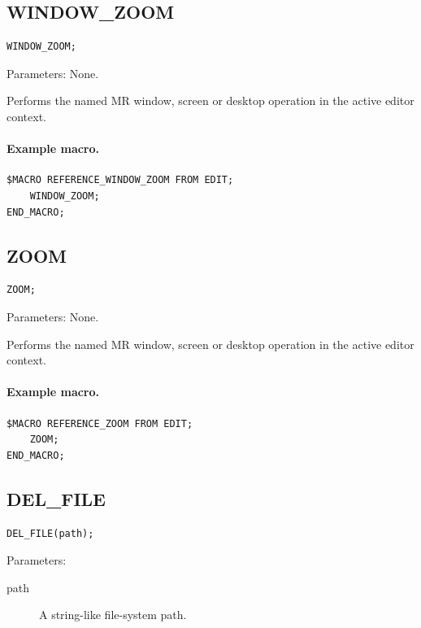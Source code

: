 \documentclass[a4paper,10pt,twoside,openany]{book}
\newenvironment{mrmacextension}{\begin{changebar}}{\end{changebar}}
\begin{document}
\begin{mrmacextension}
\label{prim:procedure-window-zoom}
\subsection*{WINDOW\_ZOOM}
\begin{verbatim}
WINDOW_ZOOM;
\end{verbatim}
Parameters: None.

Performs the named MR window, screen or desktop operation in the active editor context.

\paragraph{Example macro.}
\begin{verbatim}
$MACRO REFERENCE_WINDOW_ZOOM FROM EDIT;
    WINDOW_ZOOM;
END_MACRO;
\end{verbatim}
\end{mrmacextension}

\label{prim:procedure-zoom}
\subsection*{ZOOM}
\begin{verbatim}
ZOOM;
\end{verbatim}
Parameters: None.

Performs the named MR window, screen or desktop operation in the active editor context.

\paragraph{Example macro.}
\begin{verbatim}
$MACRO REFERENCE_ZOOM FROM EDIT;
    ZOOM;
END_MACRO;
\end{verbatim}

\label{prim:procedure-del-file}
\subsection*{DEL\_FILE}
\begin{verbatim}
DEL_FILE(path);
\end{verbatim}
Parameters:
\begin{description}
\item[path] A string-like file-system path.
\end{description}
\end{document}
